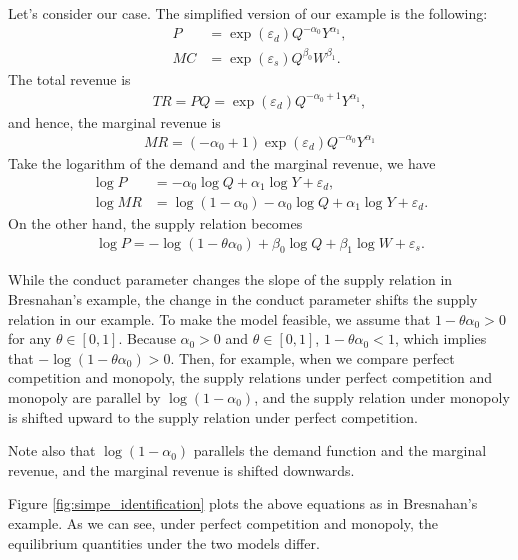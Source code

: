 \documentclass[11pt, a4paper]{article}
\theoremstyle{remark}
\begin{document}
Let's consider our case.
The simplified version of our example is the following:
\begin{align}
    P & = \exp(\varepsilon_{d}) Q^{-\alpha_0} Y^{\alpha_1},\label{eq:simple_demand} \\
    MC & = \exp(\varepsilon_{s}) Q^{\beta_0} W^{\beta_1}. \label{eq:simple_marginal_cost}
\end{align}
The total revenue is
\begin{align}
    TR = PQ = \exp(\varepsilon_{d}) Q^{-\alpha_0+1} Y^{\alpha_1},
\end{align}
and hence, the marginal revenue is
\begin{align}
    MR = (-\alpha_0+1)\exp(\varepsilon_{d}) Q^{-\alpha_0} Y^{\alpha_1}
\end{align}
Take the logarithm of the demand and the marginal revenue, we have
\begin{align}
    \log P & = -\alpha_0 \log Q + \alpha_1 \log Y + \varepsilon_d,\\
    \log MR& = \log (1 -\alpha_0) -\alpha_0 \log Q + \alpha_1 \log Y + \varepsilon_d.
\end{align}
On the other hand, the supply relation becomes
\begin{align}
    \log P = -\log (1 - \theta \alpha_0) + \beta_0 \log Q + \beta_1 \log W + \varepsilon_s. \label{eq:simple_supply}
\end{align}

While the conduct parameter changes the slope of the supply relation in Bresnahan's example, the change in the conduct parameter shifts the supply relation in our example.
To make the model feasible, we assume that $1- \theta \alpha_0 >0$ for any $\theta \in [0,1]$.
Because $\alpha_0>0$ and $\theta \in [0,1]$, $1- \theta\alpha_0 <1$, which implies that $- \log(1- \theta\alpha_0) > 0$.
Then, for example, when we compare perfect competition and monopoly,  the supply relations under perfect competition and monopoly are parallel by $\log(1 - \alpha_0)$, and the supply relation under monopoly is shifted upward to the supply relation under perfect competition.

Note also that $\log (1 - \alpha_0)$ parallels the demand function and the marginal revenue, and the marginal revenue is shifted downwards.

Figure \ref{fig:simpe_identification} plots the above equations as in Bresnahan's example.
As we can see, under perfect competition and monopoly, the equilibrium quantities under the two models differ.
\end{document}
